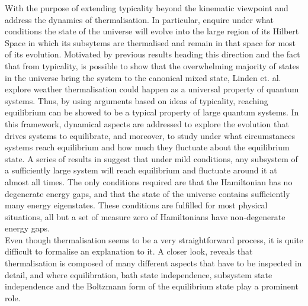  
\indent With the purpose of extending typicality beyond the kinematic viewpoint and address the dynamics of thermalisation. In particular,  enquire under what conditions the state of the universe will evolve into the large region of its Hilbert Space in which its subsytems are thermalised and remain in that space for most of its evolution. Motivated by previous results heading this direction\cite{tasaki_quantum_1998,gemmer_thermalization_2006} and the fact that from typicality, is possible to show that the overwhelming majority of states in the universe bring the system to the canonical mixed state, Linden et. al.\cite{linden_quantum_2009} explore weather thermalisation could happen as a universal property of quantum systems. Thus, by using arguments based on ideas of typicality, reaching equilibrium can be showed to be a typical property of large quantum systems. In this framework, dynamical aspects are addressed to explore the evolution that drives systems to equilibrate, and moreover, to study under what circumstances systems reach equilibrium and how much they fluctuate about the equilibrium state. A series of results in \cite{linden_quantum_2009,linden_speed_2010,malabarba_quantum_2014} suggest that under mild conditions, any subsystem of a sufficiently large system will reach equilibrium and fluctuate around it at almost all times. The only conditions required are that the Hamiltonian has no degenerate energy gaps, and that the state of the universe contains sufficiently many energy eigenstates. These conditions are fulfilled for most physical situations, all but a set of measure zero of Hamiltonians have non-degenerate energy gaps.\\



\indent Even though thermalisation seems to be a very straightforward process, it is quite difficult to formalise an explanation to it. A closer look, reveals that thermalisation is composed of many different aspects that have to be inspected in detail, and where equilibration, bath state independence, subsystem state independence and the Boltzmann form of the equilibrium state play a prominent role\cite{linden_quantum_2009}.\\ 

